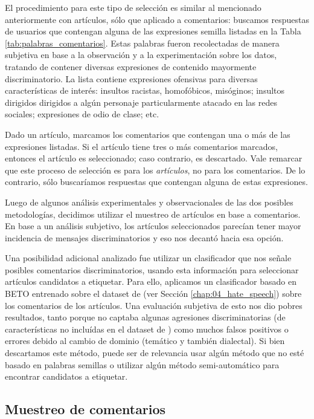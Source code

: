 El procedimiento para este tipo de selección es similar al mencionado anteriormente con artículos, sólo que aplicado a comentarios: buscamos respuestas de usuarios que contengan alguna de las expresiones semilla listadas en la Tabla \ref{tab:palabras_comentarios}. Estas palabras fueron recolectadas de manera subjetiva en base a la observación y a la experimentación sobre los datos, tratando de contener diversas expresiones de contenido mayormente discriminatorio. La lista contiene expresiones ofensivas para diversas características de interés: insultos racistas, homofóbicos, misóginos; insultos dirigidos dirigidos a algún personaje particularmente atacado en las redes sociales; expresiones de odio de clase; etc.

Dado un artículo, marcamos los comentarios que contengan una o más de las expresiones listadas. Si el artículo tiene tres o más comentarios marcados, entonces el artículo es seleccionado; caso contrario, es descartado. Vale remarcar que este proceso de selección es para los \emph{artículos}, no para los comentarios. De lo contrario, sólo buscaríamos respuestas que contengan alguna de estas expresiones.

Luego de algunos análisis experimentales y observacionales de las dos posibles metodologías, decidimos utilizar el muestreo de artículos en base a comentarios. En base a un análisis subjetivo, los artículos seleccionados parecían tener mayor incidencia de mensajes discriminatorios y eso nos decantó hacia esa opción.

Una posibilidad adicional analizado fue utilizar un clasificador que nos señale posibles comentarios discriminatorios, usando esta información para seleccionar artículos candidatos a etiquetar. Para ello, aplicamos un clasificador basado en BETO \cite{canete2020spanish} entrenado sobre el dataset de \hateval{} (ver Sección \ref{chap:04_hate_speech}) sobre los comentarios de los artículos. Una evaluación subjetiva de esto nos dio pobres resultados, tanto porque no captaba algunas agresiones discriminatorias (de características no incluídas en el dataset de \citet{hateval2019semeval}) como muchos falsos positivos o errores debido al cambio de dominio (temático y también dialectal). Si bien descartamos este método, puede ser de relevancia usar algún método que no esté basado en palabras semillas o utilizar algún método semi-automático para encontrar candidatos a etiquetar.


\subsection{Muestreo de comentarios}

